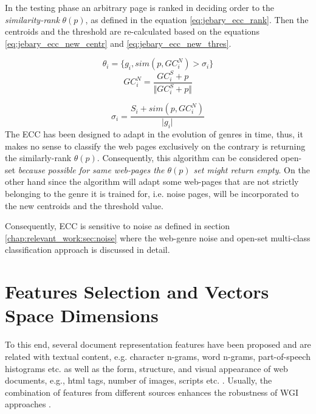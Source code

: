 In the testing phase an arbitrary page is ranked in deciding order to the \textit{similarity-rank} $\theta(p)$, as defined in the equation \ref{eq:jebary_ecc_rank}. Then the centroids and the threshold are re-calculated based on the equations \ref{eq:jebary_ecc_new_centr} and \ref{eq:jebary_ecc_new_thres}. 

\begin{equation}\label{eq:jebary_ecc_rank}
	\theta_{i} = \{g_{i}, sim(p, GC_{i}^{N}) > \sigma_{i}\}
\end{equation}
\begin{equation}\label{eq:jebary_ecc_new_centr}
	GC_{i}^{N} =  \frac{GC^{S}_{i} + p}{\Vert GC^{S}_{i}  + p\Vert}
\end{equation}

\begin{equation}\label{eq:jebary_ecc_new_thres}
	\sigma_{i} = \frac{S_{i} +  sim(p, GC_{i}^{N})}{\vert g_{i} \vert}
\end{equation}
The ECC has been designed to adapt in the evolution of genres in time, thus, it makes no sense to classify the web pages exclusively on the contrary is returning the similarly-rank $\theta(p)$. Consequently, this algorithm can be considered open-set \textit{because possible for same web-pages the  $\theta(p)$ set might return empty}. On the other hand since the algorithm will adapt some web-pages that are not strictly belonging to the genre it is trained for, i.e. noise pages, will be incorporated to the new centroids and the threshold value. 

Consequently, ECC is sensitive to noise as defined in section \ref{chap:relevant_work:sec:noise} where the web-genre noise and open-set multi-class classification approach is discussed in detail.

\section{Features Selection and Vectors Space Dimensions}\label{chap:relevant_work:sec:features}

 To this end, several document representation features have been proposed and are related with textual content, e.g. character n-grams, word n-grams, part-of-speech histograms etc. \parencite{kumari2014web,petrenz2011stable,mason2009n,sharoff2010web} as well as the form, structure, and visual appearance of web documents, e.g., html tags, number of images, scripts etc. \parencite{Lim2005,levering2008using}. Usually, the combination of features from different sources enhances the robustness of WGI approaches \parencite{levering2008using,kanaris2009learning}.

